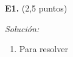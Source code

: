 \textbf{E1.} (2,5 puntos)

\vspace{20px}
\textit{Solución:}
\\

\begin{enumerate}
[label=\alph*)]
    \item Para resolver
\end{enumerate}